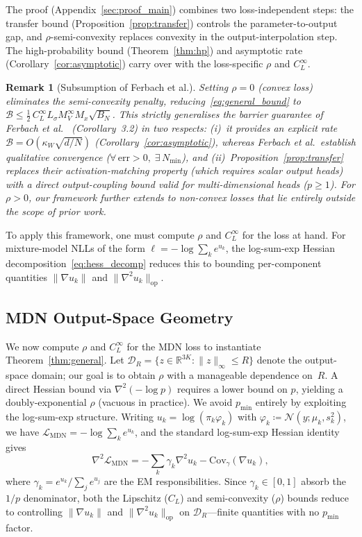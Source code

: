 \documentclass[11pt]{article}
\newtheorem{remark}[theorem]{Remark}
\newcommand{\R}{\mathbb{R}}
\newcommand{\cL}{\mathcal{L}}
\newcommand{\cN}{\mathcal{N}}
\newcommand{\cB}{\mathcal{B}}
\newcommand{\cD}{\mathcal{D}}  %
\begin{document}
The proof (Appendix~\ref{sec:proof_main}) combines two
loss-independent steps: the transfer bound
(Proposition~\ref{prop:transfer}) controls the
parameter-to-output gap, and $\rho$-semi-convexity replaces
convexity in the output-interpolation step.
The high-probability bound (Theorem~\ref{thm:hp}) and asymptotic
rate (Corollary~\ref{cor:asymptotic}) carry over with the
loss-specific $\rho$ and $C_L^\infty$.

\begin{remark}[Subsumption of Ferbach et al.]\label{rem:ferbach_recovery}
Setting $\rho=0$ (convex loss) eliminates the semi-convexity
penalty, reducing~\eqref{eq:general_bound} to
$\cB \le \tfrac{1}{2}\,C_L^\infty L_\sigma M_V^\infty M_x\sqrt{B_N}$.
This strictly generalises the barrier guarantee
of Ferbach et al.~\cite{ferbach2024} (Corollary~3.2)
in two respects:
(i)~it provides an explicit rate
$\cB=O(\kappa_W\sqrt{d/N})$
(Corollary~\ref{cor:asymptotic}),
whereas Ferbach et al.\ establish qualitative convergence
($\forall\,\mathrm{err}>0,\;\exists\,N_{\min}$), and
(ii)~Proposition~\ref{prop:transfer} replaces their
activation-matching property (which requires scalar output heads)
with a direct output-coupling bound valid for
multi-dimensional heads ($p\ge 1$).
For $\rho > 0$, our framework further extends
to non-convex losses that lie entirely outside the scope of
prior work.
\end{remark}
To apply this framework, one must compute $\rho$ and $C_L^\infty$
for the loss at hand.
For mixture-model NLLs of the form $\ell = -\log\sum_k e^{u_k}$,
the log-sum-exp Hessian decomposition~\eqref{eq:hess_decomp}
reduces this to bounding per-component quantities
$\|\nabla u_k\|$ and $\|\nabla^2 u_k\|_{\mathrm{op}}$.

\subsection{MDN Output-Space Geometry}\label{sec:output_geometry}

We now compute $\rho$ and $C_L^\infty$ for the MDN loss to
instantiate Theorem~\ref{thm:general}.
Let $\cD_R = \{z \in \R^{3K} : \|z\|_\infty \le R\}$ denote the
output-space domain; our goal is to obtain $\rho$ with a manageable
dependence on~$R$.
A direct Hessian bound via $\nabla^2(-\log p)$ requires a lower bound
on $p$, yielding a doubly-exponential $\rho$ (vacuous in practice).
We avoid $p_{\min}$ entirely by exploiting the log-sum-exp structure.
Writing $u_k = \log(\pi_k\varphi_k)$ with
$\varphi_k \coloneqq \cN(y;\mu_k,s_k^2)$,
we have $\cL_{\mathrm{MDN}} = -\log\sum_k e^{u_k}$, and the
standard log-sum-exp Hessian identity~\cite{boyd2004} gives
\begin{equation}\label{eq:hess_decomp}
  \nabla^2 \cL_{\mathrm{MDN}}
  = -\sum_k \gamma_k \nabla^2 u_k - \mathrm{Cov}_\gamma(\nabla u_k),
\end{equation}
where $\gamma_k = e^{u_k}/\sum_j e^{u_j}$ are the EM responsibilities.
Since $\gamma_k \in [0,1]$ absorb the $1/p$ denominator, both the
Lipschitz ($C_L$) and semi-convexity ($\rho$) bounds reduce to
controlling $\|\nabla u_k\|$ and $\|\nabla^2 u_k\|_{\mathrm{op}}$ on
$\cD_R$---finite quantities with no $p_{\min}$ factor.
\end{document}
